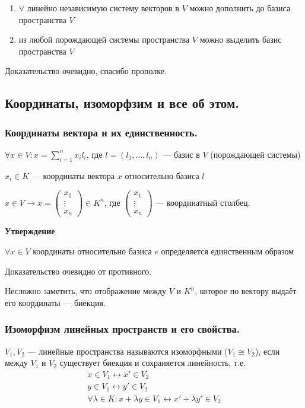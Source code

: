 \begin{enumerate}
    \item \(\forall\) линейно независимую систему векторов в \(V\) можно дополнить до базиса пространства \(V\)

    \item из любой порождающей системы пространства \(V\) можно выделить базис пространства \(V\)
\end{enumerate}

Доказательство очевидно, спасибо прополке.

\subsection{Координаты, изоморфзим и все об этом.}
\subsubsection{Координаты вектора и их единственность.}

\(\forall x \in V: x = \sum\limits_{i = 1}^{n} x_i l_i\), где \(l = (l_1, \ldots, l_n)\) --- базис в \(V\) (порождающей системы)

\(x_i \in K\) --- координаты вектора \(x\) относительно базиса \(l\)

\(x \in V \longrightarrow x =
\begin{pmatrix}
    x_{1}  \\
    \vdots \\
    x_{n}
\end{pmatrix} \in K^n\), где \(
\begin{pmatrix}
    x_{1}  \\
    \vdots \\
    x_{n}
\end{pmatrix}
\) --- координатный столбец.

\textbf{Утверждение}

\(\forall x \in V\) координаты относительно базиса \(e\) определяется единственным образом

Доказательство очевидно от противного.

Несложно заметить, что отображение между $V$ и $K^n$, которое по вектору выдаёт его координаты --- биекция.
\subsubsection{Изоморфизм линейных пространств и его свойства.}

\(V_1, V_2\) --- линейные пространства называются изоморфными (\(V_1 \cong V_2\)), если между \(V_1\) и \(V_2\) существует биекция и сохраняется линейность, т.е.
\begin{gather*}
    x \in V_1 \longleftrightarrow x' \in V_2 \\
    y \in V_1 \longleftrightarrow y' \in V_2 \\
    \forall \lambda \in K: x + \lambda y \in V_1 \longleftrightarrow x' + \lambda y' \in V_2
\end{gather*}

